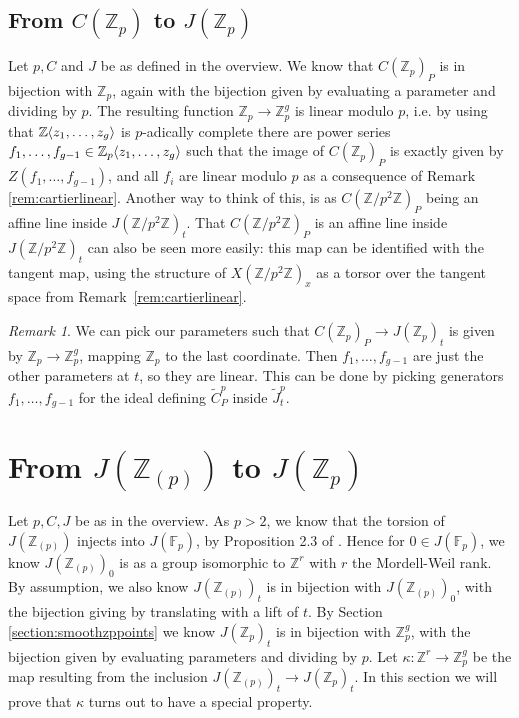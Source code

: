 \documentclass[12pt]{article}
\newcommand{\Z}{\mathbb{Z}}
\newcommand{\F}{\mathbb{F}}
\renewcommand{\angle}[1]{\hspace{-2pt}\left\langle #1 \right\rangle}
\theoremstyle{plain}
\theoremstyle{definition}
\theoremstyle{remark}
\newtheorem{rem}[thm]{Remark} %
\begin{document}
\subsection{From \texorpdfstring{$C(\Z_p)$}{C(Z\_p)} to \texorpdfstring{$J(\Z_p)$}{J(Z\_p)}}
\label{subsection:czptojzp}
Let $p,C$ and $J$ be as defined in the overview. We know that $C(\Z_p)_P$ is in bijection with $\Z_p$, again with the bijection given by evaluating a parameter and dividing by $p$. The resulting function $\Z_p \to \Z_p^g$ is linear modulo $p$, i.e. by using that $\Z\angle{z_1,\dots,z_g}$ is $p$-adically complete there are power series $f_1,\dots,f_{g-1} \in \Z_p\angle{z_1,\dots,z_g}$ such that the image of $C(\Z_p)_P$ is exactly given by $Z(f_1,\dots,f_{g-1})$, and all $f_i$ are linear modulo $p$ as a consequence of Remark \ref{rem:cartierlinear}. Another way to think of this, is as $C(\Z/p^2\Z)_P$ being an affine line inside $J(\Z/p^2\Z)_t$. That $C(\Z/p^2\Z)_P$ is an affine line inside $J(\Z/p^2\Z)_t$ can also be seen more easily: this map can be identified with the tangent map, using the structure of $X(\Z/p^2\Z)_x$ as a torsor over the tangent space from Remark~\ref{rem:cartierlinear}.

\begin{rem}
\label{rem:fislinear}
We can pick our parameters such that $C(\Z_p)_P \to J(\Z_p)_t$ is given by $\Z_p \to \Z_p^g$, mapping $\Z_p$ to the last coordinate. Then $f_1,\dots,f_{g-1}$ are just the other parameters at $t$, so they are linear. This can be done by picking generators $f_1,\dots,f_{g-1}$ for the ideal defining $\widetilde{C}_P^p$ inside $\widetilde{J}_t^p$.
\end{rem}

\section{From \texorpdfstring{$J(\Z_{(p)})$}{J(Z\_{(p)})} to \texorpdfstring{$J(\Z_p)$}{J(Z\_p)}}
\label{section:kappa}
Let $p,C,J$ be as in the overview. As $p > 2$, we know that the torsion of $J(\Z_{(p)})$ injects into $J(\F_p)$, by Proposition 2.3 of \cite{pierre2000}. Hence for $0 \in J(\F_p)$, we know $J(\Z_{(p)})_0$ is as a group isomorphic to $\Z^r$ with $r$ the Mordell-Weil rank. By assumption, we also know $J(\Z_{(p)})_t$ is in bijection with $J(\Z_{(p)})_0$, with the bijection giving by translating with a lift of $t$. By Section \ref{section:smoothzppoints} we know $J(\Z_p)_t$ is in bijection with $\Z_p^{g}$, with the bijection given by evaluating parameters and dividing by $p$. Let $\kappa: \Z^r \to \Z_p^g$ be the map resulting from the inclusion $J(\Z_{(p)})_t \to J(\Z_p)_t$. In this section we will prove that $\kappa$ turns out to have a special property.
\end{document}
